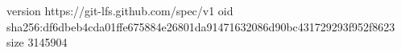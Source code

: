 version https://git-lfs.github.com/spec/v1
oid sha256:df6dbeb4cda01ffe675884e26801da91471632086d90bc431729293f952f8623
size 3145904

